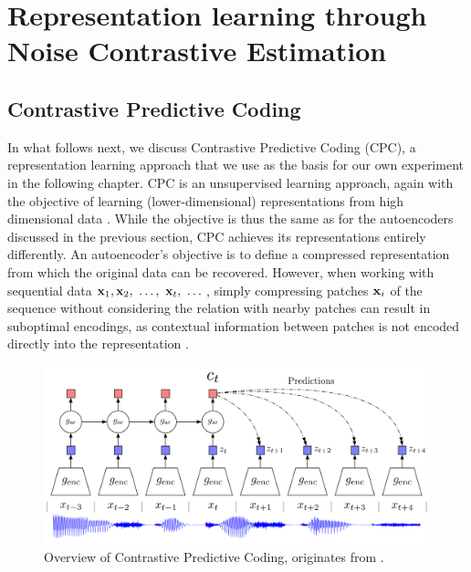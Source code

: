 	
	
	
	
	
	
	
	
	
	



\section{Representation learning through Noise Contrastive Estimation} \label{cha:bg_nce}

\subsection{Contrastive Predictive Coding}

	In what follows next, we discuss Contrastive Predictive Coding (CPC), a representation learning approach that we use as the basis for our own experiment in the following chapter.
	CPC is an unsupervised learning approach, again with the objective of learning (lower-dimensional) representations from high dimensional data \citep{oordRepresentationLearningContrastive2019}. While the objective is thus the same as for the autoencoders discussed in the previous section, CPC achieves its representations entirely differently. An autoencoder's objective is to define a compressed representation from which the original data can be recovered. However, when working with sequential data $\mathbf{x}_1,\mathbf{x}_2,~\dots, ~\mathbf{x}_t,~\dots$, simply compressing patches $\mathbf{x}_i$ of the sequence without considering the relation with nearby patches can result in suboptimal encodings, as contextual information between patches is not encoded directly into the representation \citep{shah92LearningGood2020}.


\begin{figure}[h] %
	\centering
	\includegraphics[width=0.7\linewidth]{"cpc overview"}
	\caption{Overview of Contrastive Predictive Coding, originates from \citep{oordRepresentationLearningContrastive2019}.}
	\label{fig:cpc-overview}
\end{figure}

